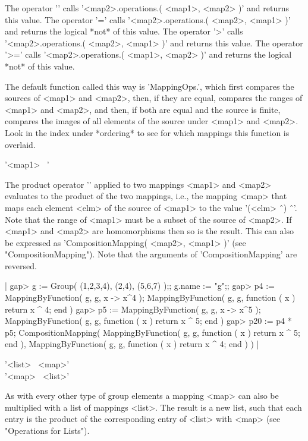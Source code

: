 The  operator  '\<'  calls  '<map2>.operations.\<( <map1>, <map2> )'  and
returns this  value.  The  operator  '\<='  calls  '<map2>.operations.\<(
<map2>, <map1> )'  and returns  the logical  *not*  of  this value.   The
operator '>' calls '<map2>.operations.\<( <map2>, <map1>  )' and  returns
this  value.   The  operator  '>=' calls  '<map2>.operations.\<(  <map1>,
<map2> )' and returns the logical *not* of this value.

The  default function called this way  is  'MappingOps.\<',  which  first
compares the sources  of  <map1> and  <map2>, then, if  they  are  equal,
compares the ranges of <map1> and <map2>, and then, if both are equal and
the source is finite, compares the  images of  all elements of the source
under <map1>  and <map2>.  Look in the index under *ordering* to  see for
which mappings this function is overlaid.


'<map1> \*\ <map2>'

The product  operator  '\*' applied  to  two  mappings <map1> and  <map2>
evaluates to  the  product of the two  mappings, i.e., the  mapping <map>
that maps each element <elm> of the source of <map1> to the value '(<elm>
\^\  <map1>) \^\ <map2>'.  Note that the range of <map1> must be a subset
of the source of <map2>.  If <map1> and <map2> are homomorphisms then  so
is  the  result.   This  can also  be expressed  as  'CompositionMapping(
<map2>, <map1> )' (see "CompositionMapping").  Note that the arguments of
'CompositionMapping' are reversed.

|    gap> g := Group( (1,2,3,4), (2,4), (5,6,7) );;  g.name := "g";;
    gap> p4 := MappingByFunction( g, g, x -> x^4 );
    MappingByFunction( g, g, function ( x )
        return x ^ 4;
    end )
    gap> p5 := MappingByFunction( g, g, x -> x^5 );
    MappingByFunction( g, g, function ( x )
        return x ^ 5;
    end )
    gap> p20 := p4 * p5;
    CompositionMapping( MappingByFunction( g, g, function ( x )
        return x ^ 5;
    end ), MappingByFunction( g, g, function ( x )
        return x ^ 4;
    end ) ) |

'<list> \*\ <map>' \\
'<map> \*\ <list>'

As with  every other type of group  elements  a mapping <map> can also be
multiplied  with a  list of  mappings <list>.   The result is a new list,
such that each entry is  the product of the corresponding entry of <list>
with <map> (see "Operations for Lists").

